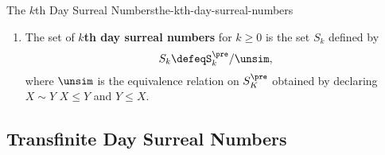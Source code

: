 \begin{definition}{The $k$th Day Surreal Numbers}{the-kth-day-surreal-numbers}
\begin{enumerate}
\[                \to%
                S^{\pre}_{k}%
            \]%
            on $S^{\pre}_{k}$ declaring $X\leq Y$ if the following conditions are satisfied:
            \begin{enumerate}
                \item\label{the-kth-day-surreal-numbers-the-order-on-kth-day-surreal-pre-numbers-a}There does not exist $x_{L}\in X_{L}$ such that $Y\leq x_{L}$.
                \item\label{the-kth-day-surreal-numbers-the-order-on-kth-day-surreal-pre-numbers-b}There does not exist $y_{R}\in Y_{R}$ such that $y_{R}\leq X$.
            \end{enumerate}
        \item\label{the-kth-day-surreal-numbers-the-kth-day-surreal-numbers}The set of \textbf{$k$th day surreal numbers} for $k\geq0$ is the set $S_{k}$ defined by
            \[
                S_{k}%
                \defeq%
                S^{\pre}_{k}/\unsim,%
            \]%
            where $\unsim$ is the equivalence relation on $S^{\pre}_{K}$ obtained by declaring $X\sim Y$ \textiff $X\leq Y$ and $Y\leq X$.
    \end{enumerate}
\end{definition}
\subsection{Transfinite Day Surreal Numbers}\label{subsection-transfinite-day-surreal-numbers}
\begin{appendices}

\end{appendices}

